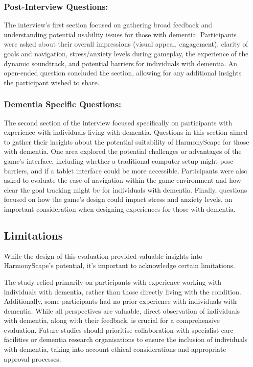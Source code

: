 \documentclass{l4proj}
\begin{document}
\subsubsection{Post-Interview Questions:} The interview's first section focused on gathering broad feedback and understanding potential usability issues for those with dementia.  Participants were asked about their overall impressions (visual appeal, engagement), clarity of goals and navigation, stress/anxiety levels during gameplay, the experience of the dynamic soundtrack, and potential barriers for individuals with dementia.  An open-ended question concluded the section, allowing for any additional insights the participant wished to share.

\subsubsection{Dementia Specific Questions:}
The second section of the interview focused specifically on participants with experience with individuals living with dementia. Questions in this section aimed to gather their insights about the potential suitability of HarmonyScape for those with dementia. One area explored the potential challenges or advantages of the game's interface, including whether a traditional computer setup might pose barriers, and if a tablet interface could be more accessible. Participants were also asked to evaluate the ease of navigation within the game environment and how clear the goal tracking might be for individuals with dementia.  Finally, questions focused on how the game's design could impact stress and anxiety levels, an important consideration when designing experiences for those with dementia.

\subsection{Limitations}
While the design of this evaluation provided valuable insights into HarmonyScape's potential, it's important to acknowledge certain limitations. 

The study relied primarily on participants with experience working with individuals with dementia, rather than those directly living with the condition. Additionally, some participants had no prior experience with individuals with dementia. While all perspectives are valuable, direct observation of individuals with dementia, along with their feedback, is crucial for a comprehensive evaluation. Future studies should prioritise collaboration with specialist care facilities or dementia research organisations to ensure the inclusion of individuals with dementia, taking into account ethical considerations and appropriate approval processes.
\end{document}

